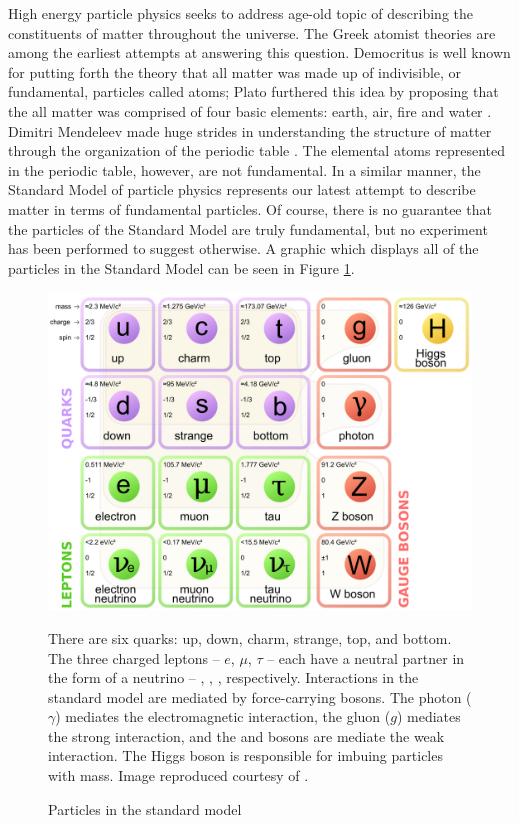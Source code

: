 High energy particle physics seeks to address age-old topic of describing the
constituents of matter throughout the universe.  The Greek atomist theories are
among the earliest attempts at answering this question.
Democritus is well
known for putting forth the theory that all matter was made up of indivisible,
or fundamental, particles called atoms;  Plato furthered this idea by proposing
that the all matter was comprised of four basic elements: earth, air, fire and
water \cite{berryman2008atomism}.  Dimitri Mendeleev made huge strides in
understanding the structure of matter through the organization of the periodic
table \cite{halzen1984quarks}.
The elemental atoms represented in the periodic table, however, are not
fundamental.  In a similar manner, the Standard Model of particle physics
represents our latest attempt to describe matter in terms of fundamental
particles.  Of course, there is no guarantee that the particles of the Standard
Model are truly fundamental, but no experiment has been performed to suggest
otherwise.  A graphic which displays all of the particles in the Standard Model
can be seen in Figure \ref{sm}.



\begin{figure}
  \begin{center}
    \includegraphics[width=\textwidth]{figures/figures/sm.png}
  \end{center}
  \caption{Particles in the
  standard model}{
  There are six quarks: up, down, charm, strange, top, and
  bottom.
  The three charged leptons -- $e$, $\mu$, $\tau$ -- each have a neutral partner
  in the form of a neutrino -- \nue, \numu, \nutau, respectively.
  Interactions in the standard model are mediated by force-carrying bosons.
  The photon ($\gamma$) mediates the electromagnetic interaction, the gluon
  ($g$) mediates the strong interaction, and the \wb and \zb bosons are
  mediate the weak interaction.
  The Higgs boson is responsible for imbuing particles with mass.
  Image reproduced courtesy of \cite{smWikiCitation}.
  }
  \label{sm}
\end{figure}

